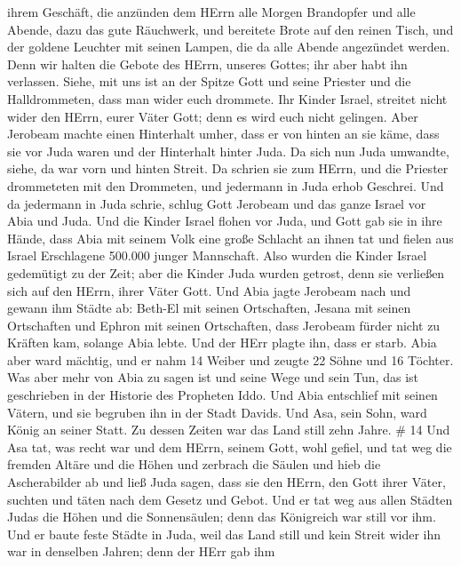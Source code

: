 ihrem Geschäft,  die anzünden dem HErrn alle Morgen
Brandopfer und alle Abende, dazu das gute Räuchwerk, und bereitete Brote
auf den reinen Tisch, und der goldene Leuchter mit seinen Lampen, die da
alle Abende angezündet werden. Denn wir halten die Gebote des HErrn,
unseres Gottes; ihr aber habt ihn verlassen.  Siehe, mit
uns ist an der Spitze Gott und seine Priester und die Halldrommeten,
dass man wider euch drommete. Ihr Kinder Israel, streitet nicht wider
den HErrn, eurer Väter Gott; denn es wird euch nicht gelingen.
 Aber Jerobeam machte einen Hinterhalt umher, dass er von
hinten an sie käme, dass sie vor Juda waren und der Hinterhalt hinter
Juda.  Da sich nun Juda umwandte, siehe, da war vorn und
hinten Streit. Da schrien sie zum HErrn, und die Priester drommeteten
mit den Drommeten,  und jedermann in Juda erhob Geschrei.
Und da jedermann in Juda schrie, schlug Gott Jerobeam und das ganze
Israel vor Abia und Juda.  Und die Kinder Israel flohen vor
Juda, und Gott gab sie in ihre Hände,  dass Abia mit seinem
Volk eine große Schlacht an ihnen tat und fielen aus Israel Erschlagene
500.000 junger Mannschaft.  Also wurden die Kinder Israel
gedemütigt zu der Zeit; aber die Kinder Juda wurden getrost, denn sie
verließen sich auf den HErrn, ihrer Väter Gott.  Und Abia
jagte Jerobeam nach und gewann ihm Städte ab: Beth-El mit seinen
Ortschaften, Jesana mit seinen Ortschaften und Ephron mit seinen
Ortschaften,  dass Jerobeam fürder nicht zu Kräften kam,
solange Abia lebte. Und der HErr plagte ihn, dass er starb.
 Abia aber ward mächtig, und er nahm 14 Weiber und zeugte
22 Söhne und 16 Töchter.  Was aber mehr von Abia zu sagen
ist und seine Wege und sein Tun, das ist geschrieben in der Historie des
Propheten Iddo.  Und Abia entschlief mit seinen Vätern, und
sie begruben ihn in der Stadt Davids. Und Asa, sein Sohn, ward König an
seiner Statt. Zu dessen Zeiten war das Land still zehn Jahre. \# 14
 Und Asa tat, was recht war und dem HErrn, seinem Gott, wohl
gefiel,  und tat weg die fremden Altäre und die Höhen und
zerbrach die Säulen und hieb die Ascherabilder ab  und ließ
Juda sagen, dass sie den HErrn, den Gott ihrer Väter, suchten und täten
nach dem Gesetz und Gebot.  Und er tat weg aus allen Städten
Judas die Höhen und die Sonnensäulen; denn das Königreich war still vor
ihm.  Und er baute feste Städte in Juda, weil das Land still
und kein Streit wider ihn war in denselben Jahren; denn der HErr gab ihm
